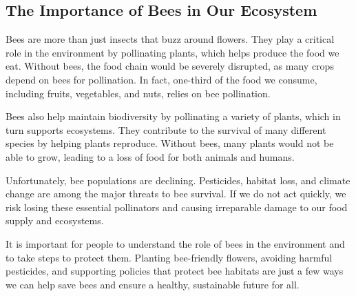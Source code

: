 \documentclass[12pt]{article}
\begin{document}
\onehalfspacing

\subsection*{The Importance of Bees in Our Ecosystem}
\begin{tcolorbox}[colframe=black!40, colback=gray!5]
\begin{spacing}{1.15}
    Bees are more than just insects that buzz around flowers. They play a critical role in the environment by pollinating plants, which helps produce the food we eat. Without bees, the food chain would be severely disrupted, as many crops depend on bees for pollination. In fact, one-third of the food we consume, including fruits, vegetables, and nuts, relies on bee pollination.

    Bees also help maintain biodiversity by pollinating a variety of plants, which in turn supports ecosystems. They contribute to the survival of many different species by helping plants reproduce. Without bees, many plants would not be able to grow, leading to a loss of food for both animals and humans.

    Unfortunately, bee populations are declining. Pesticides, habitat loss, and climate change are among the major threats to bee survival. If we do not act quickly, we risk losing these essential pollinators and causing irreparable damage to our food supply and ecosystems.

    It is important for people to understand the role of bees in the environment and to take steps to protect them. Planting bee-friendly flowers, avoiding harmful pesticides, and supporting policies that protect bee habitats are just a few ways we can help save bees and ensure a healthy, sustainable future for all.
\end{spacing}
\end{tcolorbox}

\end{document}
